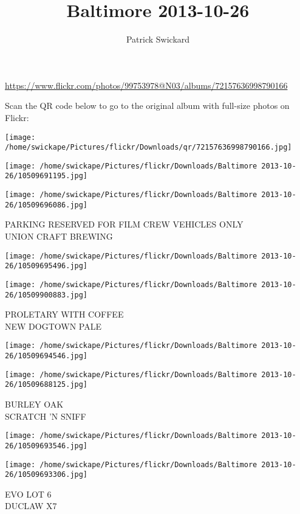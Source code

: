 \documentclass[10pt,letterpaper]{article}
\title{Baltimore 2013-10-26}
\author{Patrick Swickard}
\date{}
\begin{document}
\maketitle

\url{https://www.flickr.com/photos/99753978@N03/albums/72157636998790166}

Scan the QR code below to go to the original album with full-size photos on Flickr:

\texttt{[image: /home/swickape/Pictures/flickr/Downloads/qr/72157636998790166.jpg]}
\pagebreak

\texttt{[image: /home/swickape/Pictures/flickr/Downloads/Baltimore 2013-10-26/10509691195.jpg]}

\vspace{0.25in}
\texttt{[image: /home/swickape/Pictures/flickr/Downloads/Baltimore 2013-10-26/10509696086.jpg]}

PARKING RESERVED FOR FILM CREW VEHICLES ONLY\\
UNION CRAFT BREWING
\pagebreak

\texttt{[image: /home/swickape/Pictures/flickr/Downloads/Baltimore 2013-10-26/10509695496.jpg]}

\vspace{0.25in}
\texttt{[image: /home/swickape/Pictures/flickr/Downloads/Baltimore 2013-10-26/10509900883.jpg]}

PROLETARY WITH COFFEE\\
NEW DOGTOWN PALE
\pagebreak

\texttt{[image: /home/swickape/Pictures/flickr/Downloads/Baltimore 2013-10-26/10509694546.jpg]}

\vspace{0.25in}
\texttt{[image: /home/swickape/Pictures/flickr/Downloads/Baltimore 2013-10-26/10509688125.jpg]}

BURLEY OAK\\
SCRATCH 'N SNIFF
\pagebreak

\texttt{[image: /home/swickape/Pictures/flickr/Downloads/Baltimore 2013-10-26/10509693546.jpg]}

\vspace{0.25in}
\texttt{[image: /home/swickape/Pictures/flickr/Downloads/Baltimore 2013-10-26/10509693306.jpg]}

EVO LOT 6\\
DUCLAW X7
\pagebreak
\end{document}
